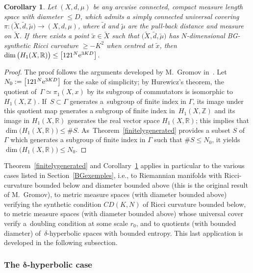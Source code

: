 \documentclass[pdftex]{sigma}
\numberwithin{equation}{section}
\newtheorem{Corollary}[theor]{Corollary}
\newcommand{\Z}{\mathbb{Z}}
\newcommand{\R}{\mathbb{R}}
\newcommand{\f}{\rightarrow}
\begin{document}
\begin{Corollary}\label{Bettinumbers0}
Let $(X,d, \mu)$ be any arcwise connected, compact measure length space with diameter $\le D$, which admits a simply connected
universal covering
$ \pi\colon \big(\widetilde X, \tilde d, \tilde \mu\big) \f (X, d, \mu)$, where $\tilde d $ and $\tilde \mu$ are the pull-back distance and measure on $\widetilde X$. If~there exists a point $\tilde x \in \widetilde X$ such that
$\big(\widetilde X, \tilde d, \tilde \mu\big)$ has $N$-dimensional BG-synthetic Ricci curvature $\ge -K^2$ when centred at $\tilde x$, then
$\dim \big( H_1 (X, \R) \big) \le \big[121^N {\rm e}^{3 K D}\big]$.
\end{Corollary}

\begin{proof}
The proof follows the arguments developed by M.~Gromov in~\cite[Section~5.20]{Gr1}. Let $N_0 := \big[121^N {\rm e}^{3 K D}\big]$
for the sake of simplicity; by Hurewicz's theorem, the quotient of~$\Gamma \simeq \pi_1 (X,x)$ by its subgroup of commutators is isomorphic to $H_1 (X, \Z)$. If~$S \subset \Gamma$ generates a~subgroup
of finite index in $\Gamma $, its image under this quotient map generates a subgroup of finite index in~$H_1 (X, \Z)$ and its image in $H_1 (X, \R)$ generates
the real vector space $H_1 (X, \R)$; this implies that $\dim \big( H_1 (X, \R) \big) \le \# S$. As~Theorem~\ref{finitelygenerated}
provides
a subset $S$ of~$\Gamma$ which generates a subgroup of finite index in $\Gamma $ such that $\# S \le N_0$, it yields $\dim \big( H_1 (X, \R) \big)
\le N_0$.
\end{proof}

Theorem~\ref{finitelygenerated} and Corollary~\ref{Bettinumbers0} applies
in particular to the various cases listed in Section~\ref{BGexemples}, i.e., to Riemannian manifolds
with Ricci-curvature bounded below and diameter bounded above (this is the original result of M.~Gromov), to metric measure spaces (with dia\-me\-ter bounded above) verifying the synthetic condition $CD (K, N)$ of Ricci curvature bounded below, to metric measure spaces (with diameter bounded above) whose universal cover verify a~doubling condition at some scale $r_0$, and to quotients (with bounded diameter) of~$\delta$-hyperbolic spaces
with bounded
entropy. This last application is developed in the following subsection.

\subsubsection[The delta-hyperbolic case]
{The $\boldsymbol\delta$-hyperbolic case}\label{hypcase}
\end{document}
